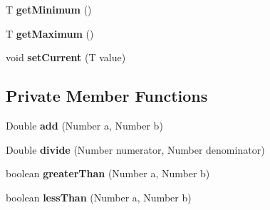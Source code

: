 \begin{DoxyCompactItemize}
\mbox{\label{classcom_1_1jack_1_1motorbikestatistics_1_1_data_item_a45cdf3ef773c9c1e69d12861deaccec0}} 
T {\bfseries get\+Minimum} ()
\item 
\mbox{\label{classcom_1_1jack_1_1motorbikestatistics_1_1_data_item_a5d58df64d90e56c7bb7e8aa8bf49aa0f}} 
T {\bfseries get\+Maximum} ()
\item 
\mbox{\label{classcom_1_1jack_1_1motorbikestatistics_1_1_data_item_abdeab9f088a2a78f66ac852993b555ca}} 
void {\bfseries set\+Current} (T value)
\end{DoxyCompactItemize}
\subsection*{Private Member Functions}
\begin{DoxyCompactItemize}
\item 
\mbox{\label{classcom_1_1jack_1_1motorbikestatistics_1_1_data_item_a4a5ad17bfa8a12bc05f6c02de92d6b36}} 
Double {\bfseries add} (Number a, Number b)
\item 
\mbox{\label{classcom_1_1jack_1_1motorbikestatistics_1_1_data_item_aab2f3e4b1cfbceb79b6477020798c417}} 
Double {\bfseries divide} (Number numerator, Number denominator)
\item 
\mbox{\label{classcom_1_1jack_1_1motorbikestatistics_1_1_data_item_a05da757bcb7a824c289a401c8e645264}} 
boolean {\bfseries greater\+Than} (Number a, Number b)
\item 
\mbox{\label{classcom_1_1jack_1_1motorbikestatistics_1_1_data_item_af8d81a7e3c07f7c3a02035c872159388}} 
boolean {\bfseries less\+Than} (Number a, Number b)
\end{DoxyCompactItemize}
